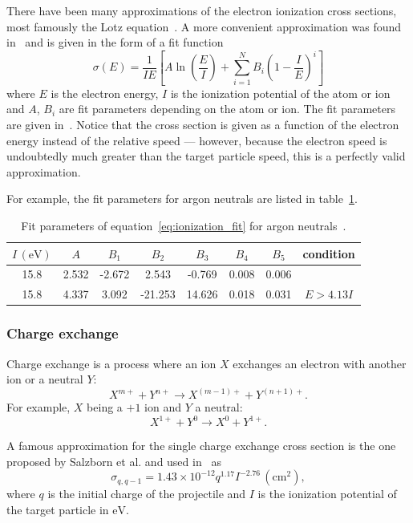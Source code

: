 \documentclass[a4paper,twoside,12pt]{article}
\begin{document}
There have been many approximations of the electron ionization cross sections, most famously the Lotz equation~\cite{lotz}. A more convenient approximation was found in~\cite{recommended_ionization} and is given in the form of a fit function
\begin{equation}
    \label{eq:ionization_fit}
    \sigma(E) = \frac{1}{IE} \left[ A \ln \left(\frac{E}{I}\right) + \sum\limits_{i=1}^N
    B_i \left(1-\frac{I}{E}\right)^i \right]
\end{equation}
where $E$ is the electron energy, $I$ is the ionization potential of the atom
or ion and $A$, $B_i$ are fit parameters depending on the atom or ion. The fit
parameters are given in~\cite{recommended_ionization}. Notice that the cross
section is given as a function of the electron energy instead of the relative
speed --- however, because the electron speed is undoubtedly much greater than the target particle speed, this is a perfectly valid approximation.

For example, the fit parameters for argon neutrals are listed in table~\ref{table:argon_ionization}.
\begin{table}
    \centering
    \caption{Fit parameters of equation~\ref{eq:ionization_fit} for argon neutrals~\cite{recommended_ionization}.}
    \label{table:argon_ionization}
    \begin{tabular}{cccccccc}
        \toprule
        $I\,(\si{\electronvolt})$ & $A$ & $B_1$ & $B_2$ & $B_3$ & $B_4$ & $B_5$ & condition\\
        \midrule
        15.8 & 2.532 & -2.672 & 2.543 & -0.769 & 0.008 & 0.006 & \\
        15.8 & 4.337 & 3.092 & -21.253 & 14.626 & 0.018 & 0.031 & $E > 4.13I$ \\
        \bottomrule
    \end{tabular}
\end{table}

\subsubsection{Charge exchange}
Charge exchange is a process where an ion $X$ exchanges an electron with
another ion or a neutral $Y$:
\[
    X^{m+} + Y^{n+} \rightarrow X^{(m-1)+} + Y^{(n+1)+}.
\]
For example, $X$ being a $+1$ ion and $Y$ a neutral:
\[
    X^{1+} + Y^0 \rightarrow X^{0} + Y^{1+}.
\]

A famous approximation for the single charge exchange cross section is the one proposed by Salzborn et al. and used in~\cite{cex} as
\begin{equation}
    \label{eq:cex}
    \sigma_{q, q-1} = 1.43 \times 10^{-12} q^{1.17} I^{-2.76}\,(\si{\centi\metre\squared}),
\end{equation}
where $q$ is the initial charge of the projectile and $I$ is the ionization potential of the target particle in $\si{\electronvolt}$.
\end{document}
